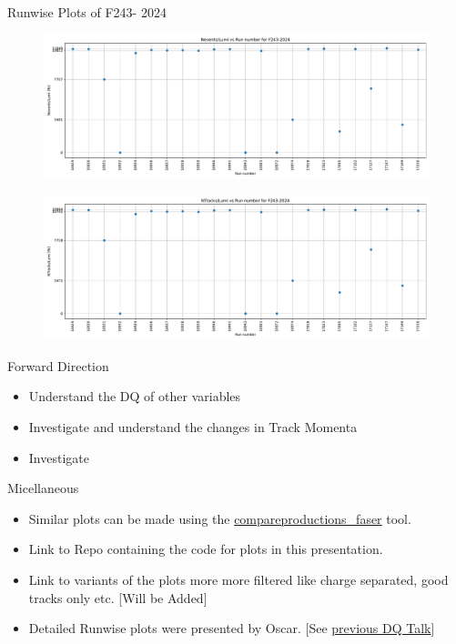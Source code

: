 \begin{frame}{Runwise Plots of F243- 2024}
    \begin{figure}
        \centering
        \includegraphics[width=1.0\textwidth]{plots_runwise/NEventsbyLumi_2024_F243.pdf}
    \end{figure}
    \vspace{-0.35cm}
    \begin{figure}
        \centering
        \includegraphics[width=1.0\textwidth]{plots_runwise/NTracksbyLumi_2024_F243.pdf}
    \end{figure}
\end{frame}

\begin{frame}{Forward Direction}
    \begin{itemize}
        \item Understand the DQ of other variables
        \item Investigate and understand the changes in Track Momenta
        \item Investigate 
    \end{itemize}
\end{frame}
\begin{frame}{Micellaneous}
    \begin{itemize}
        \item Similar plots can be made using the \href{https://gitlab.cern.ch/anburger/compareproductions_faser}{compareproductions\_faser} tool.
        \item Link to Repo containing the code for plots in this presentation.
        \item Link to variants of the plots more more filtered like charge separated, good tracks only etc. [Will be Added]
        \item Detailed Runwise plots were presented by Oscar. [See \href{https://indico.cern.ch/event/1476946/contributions/6220240/attachments/2970435/5227381/DQ2024.pdf}{previous DQ Talk}]
    \end{itemize}
\end{frame}

